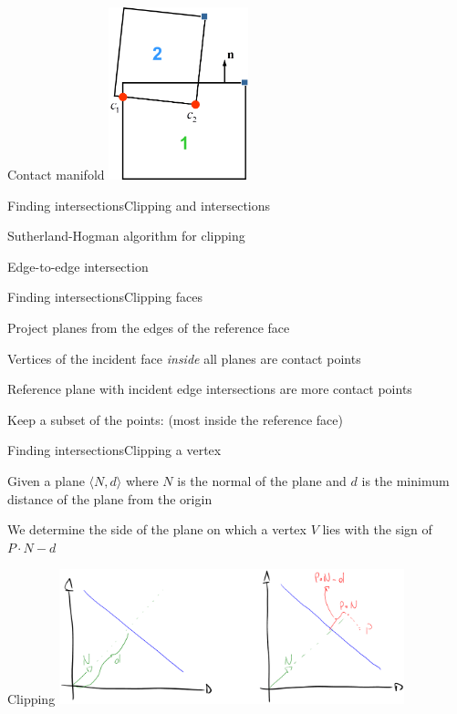 \documentclass{beamer}
\begin{document}
\begin{frame}{Contact manifold}
\center
\includegraphics[height=5cm]{Pics/ContactManifold.png}
\end{frame}

\begin{slide}{Finding intersections}{Clipping and intersections}{
\item Sutherland-Hogman algorithm for clipping
\item Edge-to-edge intersection
}\end{slide}

\begin{slide}{Finding intersections}{Clipping faces}{
\item Project planes from the edges of the reference face
\item Vertices of the incident face \textit{inside} all planes are contact points
\item Reference plane with incident edge intersections are more contact points
\item Keep a subset of the points: (most inside the reference face)
}\end{slide}

\begin{slide}{Finding intersections}{Clipping a vertex}{
\item Given a plane $\langle N,d \rangle$ where $N$ is the normal of the plane and $d$ is the minimum distance of the plane from the origin
\item We determine the side of the plane on which a vertex $V$ lies with the sign of $P \cdot N - d$
}\end{slide}

\begin{frame}{Clipping}
\center
\includegraphics[width=10cm]{Pics/PlaneVertexClipping.png}
\end{frame}
\end{document}
